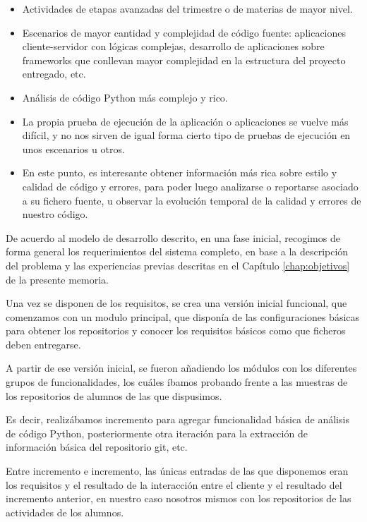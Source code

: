 \begin{itemize}
\item Actividades de etapas avanzadas del trimestre o de materias de mayor nivel.

\item Escenarios de mayor cantidad y complejidad de código fuente: aplicaciones cliente-servidor con lógicas complejas, desarrollo de aplicaciones sobre frameworks que conllevan mayor complejidad en la estructura del proyecto entregado, etc.

\item Análisis de código Python más complejo y rico.

\item La propia prueba de ejecución de la aplicación o aplicaciones se vuelve más difícil, y no nos sirven de igual forma cierto tipo de pruebas de ejecución en unos escenarios u otros.

\item En este punto, es interesante obtener información más rica sobre estilo y calidad de código y errores, para poder luego analizarse o reportarse asociado a su fichero fuente, u observar la evolución temporal de la calidad y errores de nuestro código.
\end{itemize}


De acuerdo al modelo de desarrollo descrito, en una fase inicial, recogimos de forma general los requerimientos del sistema completo, en base a la descripción del problema y las experiencias previas descritas en el Capítulo \ref{chap:objetivos} de la presente memoria.


Una vez se disponen de los requisitos, se crea una versión inicial funcional, que comenzamos con un modulo principal, que disponía de las configuraciones básicas para obtener los repositorios y conocer los requisitos básicos como que ficheros deben entregarse.


A partir de ese versión inicial, se fueron añadiendo los módulos con los diferentes grupos de funcionalidades, los cuáles íbamos probando frente a las muestras de los repositorios de alumnos de las que dispusimos.


Es decir, realizábamos incremento para agregar funcionalidad básica de análisis de código Python, posteriormente otra iteración para la extracción de información básica del repositorio git, etc.


Entre incremento e incremento, las únicas entradas de las que disponemos eran los requisitos y el resultado de la interacción entre el cliente y el resultado del incremento anterior, en nuestro caso nosotros mismos con los repositorios de las actividades de los alumnos.


